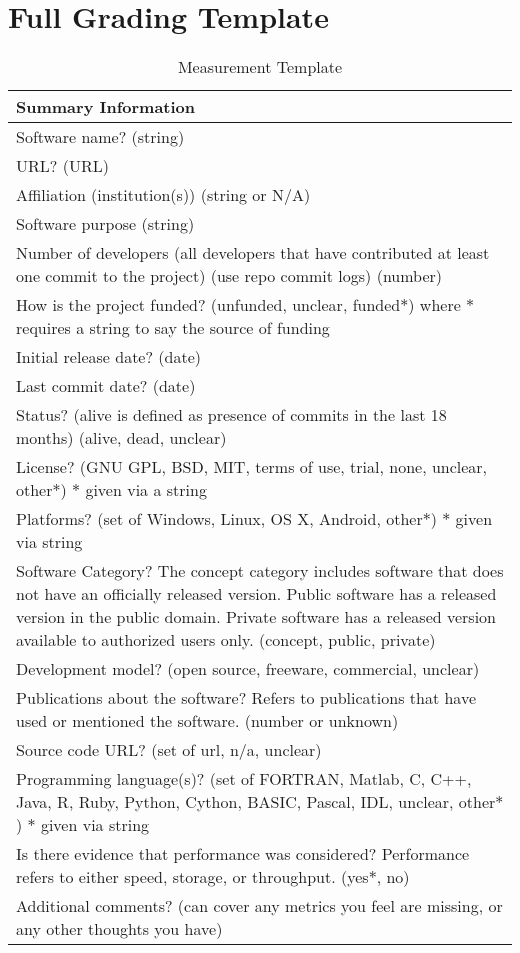 \chapter{Full Grading Template}
\label{ap_grading_template}

\newpage
\begingroup
\renewcommand{\arraystretch}{0.8}

\begin{table}[H]
\centering
\caption{Measurement Template}\label{measurementtemplate}
\begin{tabular}{p{14cm}}
\hline
\textbf{Summary Information}\\
\hline
Software name? (string)\\
URL? (URL)\\
Affiliation (institution(s)) (string or {N/A})\\
Software purpose (string)\\
Number of developers (all developers that have contributed at least one commit to the project) (use repo commit logs) (number)\\
How is the project funded? (unfunded, unclear, funded$\ast$) where $\ast$ requires a string to say the source of funding\\
Initial release date? (date)\\
Last commit date? (date)\\
Status? (alive is defined as presence of commits in the last 18 months) ({alive, dead, unclear})\\
License? ({GNU GPL, BSD, MIT, terms of use, trial, none, unclear, other$\ast$}) $\ast$ given via a string \\
Platforms? (set of {Windows, Linux, OS X, Android, other$\ast$}) $\ast$ given via string\\
Software Category? The concept category includes software that does not have an officially released version. Public software has a released version in the public domain. Private software has a released version available to authorized users only. ({concept, public, private})\\
Development model? ({open source, freeware, commercial, unclear})\\
Publications about the software? Refers to publications that have used or mentioned the software. (number or {unknown})\\
Source code URL? ({set of url, n/a, unclear})\\
Programming language(s)? (set of {FORTRAN, Matlab, C, C++, Java, R, Ruby, Python, Cython, BASIC, Pascal, IDL, unclear, other$\ast$}) $\ast$ given via string \\
Is there evidence that performance was considered? Performance refers to either speed, storage, or throughput. ({yes$\ast$, no})\\
Additional comments? (can cover any metrics you feel are missing, or any other thoughts you have) \\
\hline
\end{tabular}
\end{table}

